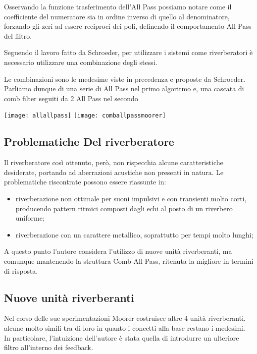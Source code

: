 Osservando la funzione trasferimento dell’All Pass possiamo notare come il coefficiente del numeratore sia in ordine inverso di quello al denominatore, forzando gli zeri ad essere reciproci dei poli, definendo il comportamento All Pass del filtro.

Seguendo il lavoro fatto da Schroeder, per utilizzare i sistemi come riverberatori è necessario utilizzare una combinazione degli stessi.

Le combinazioni sono le medesime viste in precedenza e proposte da Schroeder. Parliamo dunque di una serie di All Pass nel primo algoritmo e, una cascata di comb filter seguiti da 2 All Pass nel secondo

\begin{center}
\texttt{[image: allallpass]}
\smallskip
\texttt{[image: comballpassmoorer]}
\end{center}

\subsection{Problematiche Del riverberatore}

Il riverberatore così ottenuto, però, non rispecchia alcune caratteristiche desiderate, portando ad aberrazioni acustiche non presenti in natura.
Le problematiche riscontrate possono essere riassunte in:

\begin{itemize}
\item riverberazione non ottimale per suoni impulsivi e con transienti molto corti, producendo pattern ritmici composti dagli echi al posto di un riverbero uniforme;
\item riverberazione con un carattere metallico, soprattutto per tempi molto lunghi;
\end{itemize}

A questo punto l’autore considera l’utilizzo di nuove unità riverberanti, ma comunque mantenendo la struttura Comb-All Pass, ritenuta la migliore in termini di risposta. 

\subsection{Nuove unità riverberanti}

Nel corso delle sue sperimentazioni Moorer costruisce altre 4 unità riverberanti, alcune molto simili tra di loro in quanto i concetti alla base restano i medesimi. In particolare, l’intuizione dell’autore è stata quella di introdurre un ulteriore filtro all’interno dei feedback.

